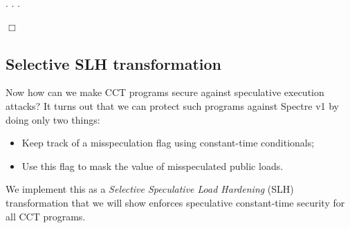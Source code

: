 \documentclass[12pt]{report}
\begin{document}
\begin{coqdoccode}
\coqdocindent{1.00em}
       \coqdoceol
\coqdocindent{1.00em}
  .\coqdoceol
\coqdocnoindent
{}.\coqdoceol
 .\coqdoceol
\end{coqdoccode}
\ensuremath{\Box} 
\begin{coqdoccode}
\coqdocemptyline
\end{coqdoccode}
\subsection{Selective SLH transformation}



 Now how can we make CCT programs secure against speculative execution
    attacks? It turns out that we can protect such programs against Spectre v1
    by doing only two things:

\begin{itemize}
\item  Keep track of a misspeculation flag using constant-time conditionals;

\item  Use this flag to mask the value of misspeculated public loads.

\end{itemize}


    We implement this as a \textit{Selective Speculative Load Hardening} (SLH)
    transformation that we will show enforces speculative constant-time security
    for all CCT programs.
\end{document}

